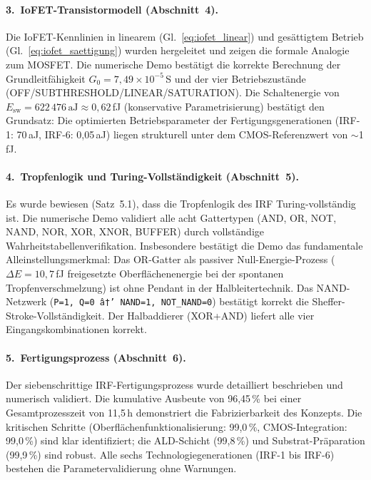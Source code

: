 ﻿\documentclass[a4paper,12pt]{scrreprt}
\theoremstyle{definition}
\begin{document}
\paragraph{3.~IoFET-Transistormodell (Abschnitt~4).}
Die IoFET-Kennlinien in linearem (Gl.~\ref{eq:iofet_linear}) und
gesättigtem Betrieb (Gl.~\ref{eq:iofet_saettigung}) wurden hergeleitet
und zeigen die formale Analogie zum MOSFET. Die numerische Demo
bestätigt die korrekte Berechnung der Grundleitfähigkeit
$G_0 = 7{,}49 \times 10^{-5}$\,S und der vier Betriebszustände
(OFF/SUBTHRESHOLD/LINEAR/SATURATION). Die Schaltenergie von
$E_\text{sw} = 622\,476\,\text{aJ} \approx 0{,}62$\,fJ (konservative
Parametrisierung) bestätigt den Grundsatz: Die optimierten
Betriebsparameter der Fertigungsgenerationen (IRF-1: 70\,aJ,
IRF-6: 0,05\,aJ) liegen strukturell unter dem CMOS-Referenzwert
von $\sim$1\,fJ.

\paragraph{4.~Tropfenlogik und Turing-Vollständigkeit (Abschnitt~5).}
Es wurde bewiesen (Satz~5.1), dass die Tropfenlogik des IRF
Turing-vollständig ist. Die numerische Demo validiert alle acht
Gattertypen (AND, OR, NOT, NAND, NOR, XOR, XNOR, BUFFER) durch
vollständige Wahrheitstabellenverifikation. Insbesondere bestätigt
die Demo das fundamentale Alleinstellungsmerkmal: Das OR-Gatter
als passiver Null-Energie-Prozess ($\Delta E = 10{,}7$\,fJ
freigesetzte Oberflächenenergie bei der spontanen Tropfenver\-schmelzung)
ist ohne Pendant in der Halbleitertechnik. Das NAND-Netzwerk
(\texttt{P=1, Q=0 â†’ NAND=1, NOT\_NAND=0}) bestätigt korrekt
die Sheffer-Stroke-Vollständigkeit. Der Halbaddierer (XOR+AND)
liefert alle vier Eingangskombinationen korrekt.

\paragraph{5.~Fertigungsprozess (Abschnitt~6).}
Der siebenschrittige IRF-Fertigungsprozess wurde detailliert beschrieben
und numerisch validiert. Die kumulative Ausbeute von 96,45\,\%
bei einer Gesamtprozesszeit von 11,5\,h demonstriert die
Fabrizierbarkeit des Konzepts. Die kritischen Schritte
(Oberflächenfunktionalisierung: 99,0\,\%, CMOS-Integration: 99,0\,\%)
sind klar identifiziert; die ALD-Schicht (99,8\,\%) und
Substrat-Präparation (99,9\,\%) sind robust. Alle sechs
Technologiegenerationen (IRF-1 bis IRF-6) bestehen die
Parametervalidierung ohne Warnungen.
\end{document}
